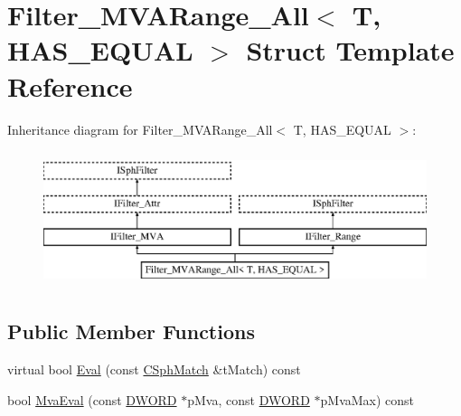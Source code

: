 \hypertarget{structFilter__MVARange__All}{\section{Filter\-\_\-\-M\-V\-A\-Range\-\_\-\-All$<$ T, H\-A\-S\-\_\-\-E\-Q\-U\-A\-L $>$ Struct Template Reference}
\label{structFilter__MVARange__All}
}
Inheritance diagram for Filter\-\_\-\-M\-V\-A\-Range\-\_\-\-All$<$ T, H\-A\-S\-\_\-\-E\-Q\-U\-A\-L $>$\-:\begin{figure}[H]
\begin{center}
\leavevmode
\includegraphics[height=4.000000cm]{structFilter__MVARange__All}
\end{center}
\end{figure}
\subsection*{Public Member Functions}
\begin{DoxyCompactItemize}
\item 
virtual bool \hyperlink{structFilter__MVARange__All_aed9a4b1266e7919f98f74ba87b99cb44}{Eval} (const \hyperlink{classCSphMatch}{C\-Sph\-Match} \&t\-Match) const 
\item 
bool \hyperlink{structFilter__MVARange__All_a538f9c66c4ec140649ef568ad202ffaf}{Mva\-Eval} (const \hyperlink{sphinxstd_8h_a798af1e30bc65f319c1a246cecf59e39}{D\-W\-O\-R\-D} $\ast$p\-Mva, const \hyperlink{sphinxstd_8h_a798af1e30bc65f319c1a246cecf59e39}{D\-W\-O\-R\-D} $\ast$p\-Mva\-Max) const 
\end{DoxyCompactItemize}

